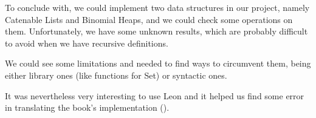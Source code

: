 To conclude with, we could implement two data structures in our project,
namely Catenable Lists and Binomial Heaps,
and we could check some operations on them.
Unfortunately, we have some unknown results, 
which are probably difficult to avoid 
when we have recursive definitions.

We could see some limitations and needed to find ways to circumvent them, 
being either library ones (like functions for Set) or syntactic ones.

It was nevertheless very interesting to use Leon and it helped us find some error 
in translating the book's implementation (\citep{Okasaki}).

